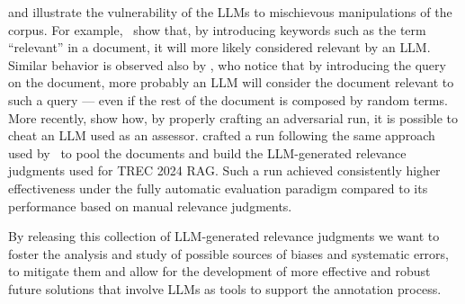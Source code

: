 \citet{DBLP:conf/ecir/ParryFMPH24} and \citet{DBLP:conf/sigir-ap/Alaofi0SS24} illustrate the vulnerability of the \acp{LLM} to mischievous manipulations of the corpus. For example,~\citet{DBLP:conf/ecir/ParryFMPH24} show that, by introducing keywords such as the term ``relevant'' in a document, it will more likely considered relevant by an \ac{LLM}. Similar behavior is observed also by \citet{DBLP:conf/sigir-ap/Alaofi0SS24}, who notice that by introducing the query on the document, more probably an \ac{LLM} will consider the document relevant to such a query --- even if the rest of the document is composed by random terms.
More recently, \citet{DBLP:journals/corr/abs-2412-17156} show how, by properly crafting an adversarial run, it is possible to cheat an \ac{LLM} used as an assessor. \citet{DBLP:journals/corr/abs-2412-17156} crafted a run following the same approach used by~\citet{upadhyay2024umbrela} to pool the documents and build the \ac{LLM}-generated relevance judgments used for TREC 2024 RAG. Such a run achieved consistently higher effectiveness under the fully automatic evaluation paradigm compared to its performance based on manual relevance judgments. 

By releasing this collection of \ac{LLM}-generated relevance judgments we want to foster the analysis and study of possible sources of biases and systematic errors, to mitigate them and allow for the development of more effective and robust future solutions that involve \acp{LLM} as tools to support the annotation process.